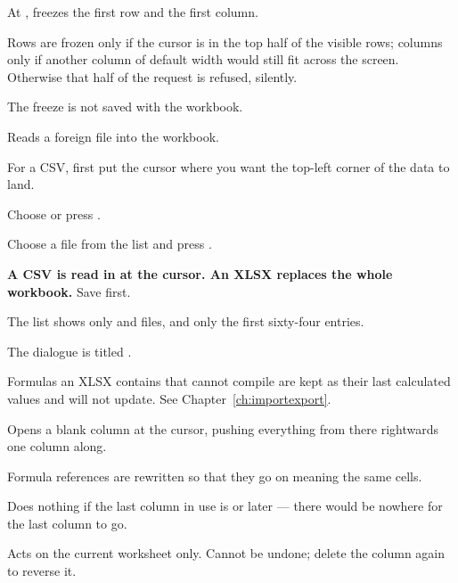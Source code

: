 \begin{ccsteps}
\item At , freezes the first row and the first column.
\item Rows are frozen only if the cursor is in the top half of the visible
rows; columns only if another column of default width would still fit across
the screen. Otherwise that half of the request is refused, silently.
\item The freeze is not saved with the workbook.
\end{ccsteps}


Reads a foreign file into the workbook.

\begin{ccprocedure}[]
\item For a CSV, first put the cursor where you want the top-left corner of the
data to land.
\item Choose  or press .
\item Choose a file from the list and press .
\end{ccprocedure}

\begin{ccsteps}
\item \textbf{A CSV is read in at the cursor. An XLSX replaces the whole
workbook.} Save first.
\item The list shows only  and  files, and only the
first sixty-four entries.
\item The dialogue is titled .
\item Formulas an XLSX contains that \ccprod{} cannot compile are kept as their
last calculated values and will not update. See Chapter~\ref{ch:importexport}.
\end{ccsteps}


Opens a blank column at the cursor, pushing everything from there rightwards
one column along.

\begin{ccsteps}
\item Formula references are rewritten so that they go on meaning the same
cells.
\item Does nothing if the last column in use is  or later --- there
would be nowhere for the last column to go.
\item Acts on the current worksheet only. Cannot be undone; delete the column
again to reverse it.
\end{ccsteps}

